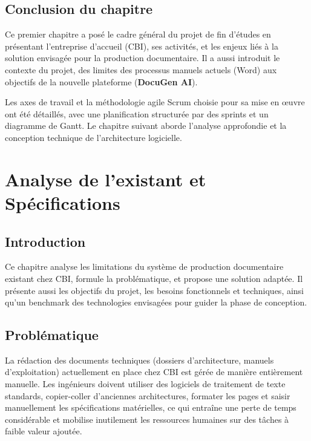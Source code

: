 \documentclass[12pt, a4paper]{report}
\begin{document}
\section*{Conclusion du chapitre}

Ce premier chapitre a posé le cadre général du projet de fin d'études en présentant l'entreprise d'accueil (CBI), ses activités, et les enjeux liés à la solution envisagée pour la production documentaire. Il a aussi introduit le contexte du projet, des limites des processus manuels actuels (Word) aux objectifs de la nouvelle plateforme (\textbf{DocuGen AI}). 

Les axes de travail et la méthodologie agile Scrum choisie pour sa mise en œuvre ont été détaillés, avec une planification structurée par des sprints et un diagramme de Gantt. Le chapitre suivant aborde l'analyse approfondie et la conception technique de l'architecture logicielle.

\chapter{Analyse de l'existant et Spécifications}

\section*{Introduction}
Ce chapitre analyse les limitations du système de production documentaire existant chez CBI, formule la problématique, et propose une solution adaptée. Il présente aussi les objectifs du projet, les besoins fonctionnels et techniques, ainsi qu'un benchmark des technologies envisagées pour guider la phase de conception.

\section{Problématique}
La rédaction des documents techniques (dossiers d'architecture, manuels d'exploitation) actuellement en place chez CBI est gérée de manière entièrement manuelle. Les ingénieurs doivent utiliser des logiciels de traitement de texte standards, copier-coller d'anciennes architectures, formater les pages et saisir manuellement les spécifications matérielles, ce qui entraîne une perte de temps considérable et mobilise inutilement les ressources humaines sur des tâches à faible valeur ajoutée.
\end{document}
